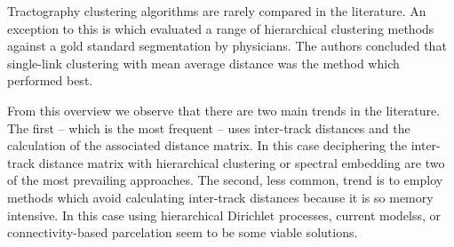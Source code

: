 \documentclass[preprint,authoryear,a4paper,10pt,onecolumn]{elsarticle}
\begin{document}






 




Tractography clustering algorithms are rarely compared in the
literature. An exception to this is \citep{moberts2005evaluation} which
evaluated a range of hierarchical clustering methods against a gold
standard segmentation by physicians. The authors concluded that
single-link clustering with mean average distance was the method which
performed best.

From this overview we observe that there are two main trends in the
literature. The first -- which is the most frequent -- uses inter-track
distances and the calculation of the associated distance matrix. In this
case deciphering the inter-track distance matrix with hierarchical
clustering or spectral embedding are two of the most prevailing
approaches. The second, less common, trend is to employ methods which
avoid calculating inter-track distances because it is so memory
intensive. In this case using hierarchical Dirichlet processes,
current modelss, or connectivity-based parcelation seem to be some viable
solutions.
\end{document}

